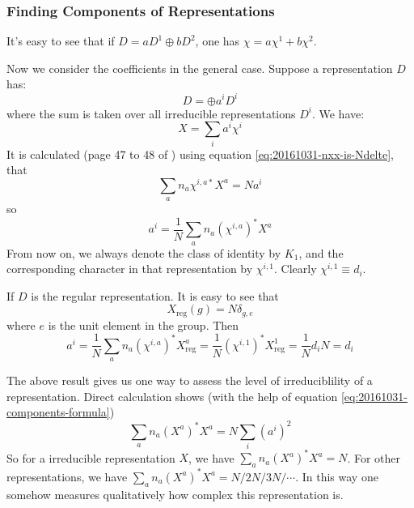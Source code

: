     \subsubsection{Finding Components of Representations}
    \label{sec:Finding-Components-of-Representations}
    \begin{remark}
        It's easy to see that if $D=aD^1\oplus bD^2$, one has $\chi =
        a\chi^1 + b\chi^2$.
    \end{remark}
    Now we consider the coefficients in the general case. Suppose a
    representation $D$ has:
    \begin{equation}
        D = \oplus a^i D^i
    \end{equation}
    where the sum is taken over all irreducible representations
    $D^i$. We have:
    \begin{equation}
        \label{eq:20161031-X_components}
        X = \sum_{i} a^i \chi^i
    \end{equation}
    It is calculated (page 47 to 48 of \cite{Ludeling}) using equation
    \ref{eq:20161031-nxx-is-Ndelte},
    that
    \begin{equation}
        \sum_a n_a \chi^{i,a*}X^a = N a^i
    \end{equation}
    so
    \begin{equation}
        a^i = \frac{1}{N} \sum_a n_a(\chi^{i,a})^* X^a
        \label{eq:20161031-components-formula}
    \end{equation}
    From now on, we always denote the class of identity by $K_1$, and
    the corresponding character in that representation by
    $\chi^{i,1}$. Clearly $\chi^{i,1}\equiv d_i$.
    \begin{ex}
        If $D$ is the regular representation. It is easy to see that
        \begin{equation}
            \label{eq:20161031-X-characters}
            X_\text{reg}(g) = N \delta_{g,e}
        \end{equation}
        where $e$ is the unit element in the group.
        Then
        \begin{equation}
            \label{eq:20161031-X_components_reg}
            a^i = \frac{1}{N}\sum_a n_a (\chi^{i,a})^* X^a_\text{reg}
            = \frac{1}{N} (\chi^{i,1})^* X^1_\text{reg} = 
            \frac{1}{N} d_i N = d_i
        \end{equation}
    \end{ex}
    \begin{remark}
        The above result gives us one way to assess the level of
        irreduciblility of a representation. Direct calculation shows
        (with the help of equation
        \ref{eq:20161031-components-formula})
        \begin{equation}
            \sum_a n_a (X^a)^* X^a = N \sum_i (a^i)^2
        \end{equation}
        So for a irreducible representation $X$, we have $\sum_a n_a
        (X^a)^* X^a= N$. For other representations, we have $\sum_a
        n_a (X^a)^* X^a= N/2N/3N/\cdots$. In this way one somehow
        measures qualitatively how complex this representation is.
    \end{remark}

